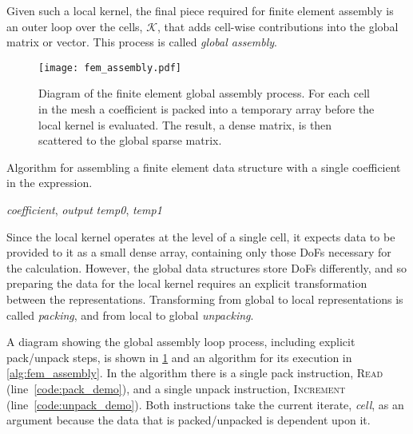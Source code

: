 \documentclass[thesis]{subfiles}
\begin{document}
Given such a local kernel, the final piece required for finite element assembly is an outer loop over the cells, $\mathcal{K}$, that adds cell-wise contributions into the global matrix or vector.
This process is called \emph{global assembly}.

\begin{figure}
  \centering
  \texttt{[image: fem\_assembly.pdf]}
  \caption{
    Diagram of the finite element global assembly process.
    For each cell in the mesh a coefficient is packed into a temporary array before the local kernel is evaluated.
    The result, a dense matrix, is then scattered to the global sparse matrix.
  }
  \label{fig:fem_assembly}
\end{figure}

\begin{algorithm}
  \caption{
    Algorithm for assembling a finite element data structure with a single coefficient in the expression.
  }
  \begin{algorithmic}[1]
    \Require \textit{coefficient}, \textit{output} 
    \Require \textit{temp0}, \textit{temp1} 

      \State {} \label{code:pack_demo}
      \State {} 
      \State {} 
      \State {} \label{code:unpack_demo}
    \EndFor
  \end{algorithmic}
  \label{alg:fem_assembly}
\end{algorithm}

Since the local kernel operates at the level of a single cell, it expects data to be provided to it as a small dense array, containing only those DoFs necessary for the calculation.
However, the global data structures store DoFs differently, and so preparing the data for the local kernel requires an explicit transformation between the representations.
Transforming from global to local representations is called \emph{packing}, and from local to global \emph{unpacking}.

A diagram showing the global assembly loop process, including explicit pack/unpack steps, is shown in \cref{fig:fem_assembly} and an algorithm for its execution in \cref{alg:fem_assembly}.
In the algorithm there is a single pack instruction, \textsc{Read} (line~\ref{code:pack_demo}), and a single unpack instruction, \textsc{Increment} (line~\ref{code:unpack_demo}).
Both instructions take the current iterate, \textit{cell}, as an argument because the data that is packed/unpacked is dependent upon it.
\end{document}
